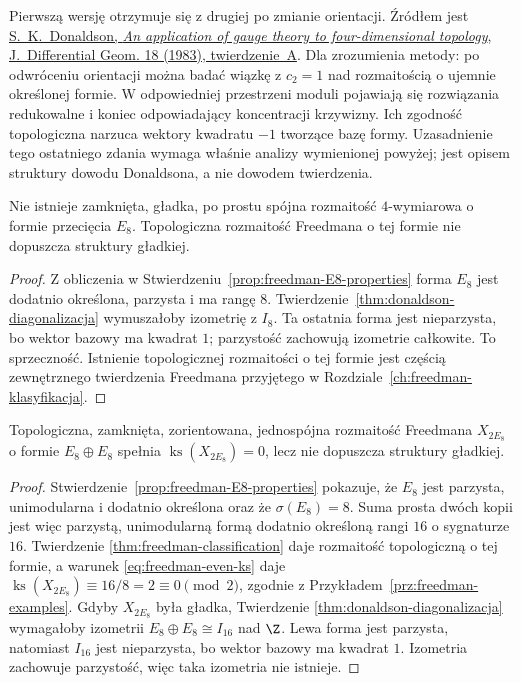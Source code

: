 Pierwszą wersję otrzymuje się z drugiej po zmianie
orientacji. Źródłem jest
\href{https://doi.org/10.4310/jdg/1214437665}
{S.~K.~Donaldson, \emph{An application of gauge theory to
four-dimensional topology}, J.~Differential Geom. 18 (1983),
twierdzenie~A}. Dla zrozumienia metody: po odwróceniu
orientacji można badać wiązkę z $c_2=1$ nad rozmaitością
o ujemnie określonej formie. W odpowiedniej przestrzeni
moduli pojawiają się rozwiązania redukowalne i koniec
odpowiadający koncentracji krzywizny. Ich zgodność
topologiczna narzuca wektory kwadratu $-1$ tworzące
bazę formy. Uzasadnienie tego ostatniego zdania wymaga
właśnie analizy wymienionej powyżej; jest opisem struktury
dowodu Donaldsona, a nie dowodem twierdzenia.

\begin{wniosek}
\label{cor:donaldson-e8}
Nie istnieje zamknięta, gładka, po prostu spójna
rozmaitość $4$-wymiarowa o formie przecięcia $E_8$.
Topologiczna rozmaitość Freedmana o tej formie
nie dopuszcza struktury gładkiej.
\end{wniosek}
\begin{proof}
Z obliczenia w
Stwierdzeniu~\ref{prop:freedman-E8-properties} forma
$E_8$ jest dodatnio określona, parzysta i ma rangę $8$.
Twierdzenie~\ref{thm:donaldson-diagonalizacja}
wymuszałoby izometrię z $I_8$. Ta ostatnia forma
jest nieparzysta, bo wektor bazowy ma kwadrat $1$;
parzystość zachowują izometrie całkowite. To sprzeczność.
Istnienie topologicznej rozmaitości o tej formie jest
częścią zewnętrznego twierdzenia Freedmana przyjętego
w Rozdziale~\ref{ch:freedman-klasyfikacja}.
\end{proof}

\begin{wniosek}
\label{cor:donaldson-2e8}
Topologiczna, zamknięta, zorientowana, jednospójna
rozmaitość Freedmana $X_{2E_8}$ o formie
$E_8\oplus E_8$ spełnia $\operatorname{ks}(X_{2E_8})=0$,
lecz nie dopuszcza struktury gładkiej.
\end{wniosek}
\begin{proof}
Stwierdzenie~\ref{prop:freedman-E8-properties}
pokazuje, że $E_8$ jest parzysta, unimodularna
i dodatnio określona oraz że $\sigma(E_8)=8$.
Suma prosta dwóch kopii jest więc parzystą,
unimodularną formą dodatnio określoną rangi $16$
o sygnaturze $16$. Twierdzenie
\ref{thm:freedman-classification} daje rozmaitość
topologiczną o tej formie, a warunek
\eqref{eq:freedman-even-ks} daje
$\operatorname{ks}(X_{2E_8})\equiv16/8=2\equiv0\pmod2$,
zgodnie z Przykładem~\ref{prz:freedman-examples}.
Gdyby $X_{2E_8}$ była gładka, Twierdzenie
\ref{thm:donaldson-diagonalizacja} wymagałoby
izometrii $E_8\oplus E_8\cong I_{16}$ nad $\Z$.
Lewa forma jest parzysta, natomiast $I_{16}$
jest nieparzysta, bo wektor bazowy ma kwadrat $1$.
Izometria zachowuje parzystość, więc taka
izometria nie istnieje.
\end{proof}


